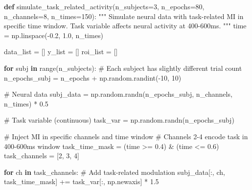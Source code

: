 \documentclass[
  11pt,
  letterpaper,
  oneside,
  openany]{book}
\newenvironment{Shaded}{\begin{snugshade}}{\end{snugshade}}
\newcommand{\BuiltInTok}[1]{\textcolor[rgb]{0.00,0.23,0.31}{#1}}
\newcommand{\CommentTok}[1]{\textcolor[rgb]{0.37,0.37,0.37}{#1}}
\newcommand{\ControlFlowTok}[1]{\textcolor[rgb]{0.00,0.23,0.31}{\textbf{#1}}}
\newcommand{\DecValTok}[1]{\textcolor[rgb]{0.68,0.00,0.00}{#1}}
\newcommand{\FloatTok}[1]{\textcolor[rgb]{0.68,0.00,0.00}{#1}}
\newcommand{\KeywordTok}[1]{\textcolor[rgb]{0.00,0.23,0.31}{\textbf{#1}}}
\newcommand{\NormalTok}[1]{\textcolor[rgb]{0.00,0.23,0.31}{#1}}
\newcommand{\OperatorTok}[1]{\textcolor[rgb]{0.37,0.37,0.37}{#1}}
\begin{document}
\begin{Shaded}
\begin{Highlighting}[]
\KeywordTok{def}\NormalTok{ simulate\_task\_related\_activity(n\_subjects}\OperatorTok{=}\DecValTok{3}\NormalTok{, n\_epochs}\OperatorTok{=}\DecValTok{80}\NormalTok{, n\_channels}\OperatorTok{=}\DecValTok{8}\NormalTok{, n\_times}\OperatorTok{=}\DecValTok{150}\NormalTok{):}
    \CommentTok{"""}
\CommentTok{    Simulate neural data with task{-}related MI in specific time window.}
\CommentTok{    }
\CommentTok{    Task variable affects neural activity at 400{-}600ms.}
\CommentTok{    """}
\NormalTok{    time }\OperatorTok{=}\NormalTok{ np.linspace(}\OperatorTok{{-}}\FloatTok{0.2}\NormalTok{, }\FloatTok{1.0}\NormalTok{, n\_times)}
    
\NormalTok{    data\_list }\OperatorTok{=}\NormalTok{ []}
\NormalTok{    y\_list }\OperatorTok{=}\NormalTok{ []}
\NormalTok{    roi\_list }\OperatorTok{=}\NormalTok{ []}
    
    \ControlFlowTok{for}\NormalTok{ subj }\KeywordTok{in} \BuiltInTok{range}\NormalTok{(n\_subjects):}
        \CommentTok{\# Each subject has slightly different trial count}
\NormalTok{        n\_epochs\_subj }\OperatorTok{=}\NormalTok{ n\_epochs }\OperatorTok{+}\NormalTok{ np.random.randint(}\OperatorTok{{-}}\DecValTok{10}\NormalTok{, }\DecValTok{10}\NormalTok{)}
        
        \CommentTok{\# Neural data}
\NormalTok{        subj\_data }\OperatorTok{=}\NormalTok{ np.random.randn(n\_epochs\_subj, n\_channels, n\_times) }\OperatorTok{*} \FloatTok{0.5}
        
        \CommentTok{\# Task variable (continuous)}
\NormalTok{        task\_var }\OperatorTok{=}\NormalTok{ np.random.randn(n\_epochs\_subj)}
        
        \CommentTok{\# Inject MI in specific channels and time window}
        \CommentTok{\# Channels 2{-}4 encode task in 400{-}600ms window}
\NormalTok{        task\_time\_mask }\OperatorTok{=}\NormalTok{ (time }\OperatorTok{\textgreater{}=} \FloatTok{0.4}\NormalTok{) }\OperatorTok{\&}\NormalTok{ (time }\OperatorTok{\textless{}=} \FloatTok{0.6}\NormalTok{)}
\NormalTok{        task\_channels }\OperatorTok{=}\NormalTok{ [}\DecValTok{2}\NormalTok{, }\DecValTok{3}\NormalTok{, }\DecValTok{4}\NormalTok{]}
        
        \ControlFlowTok{for}\NormalTok{ ch }\KeywordTok{in}\NormalTok{ task\_channels:}
            \CommentTok{\# Add task{-}related modulation}
\NormalTok{            subj\_data[:, ch, task\_time\_mask] }\OperatorTok{+=}\NormalTok{ task\_var[:, np.newaxis] }\OperatorTok{*} \FloatTok{1.5}
        

\end{Highlighting}
\end{Shaded}
\end{document}

